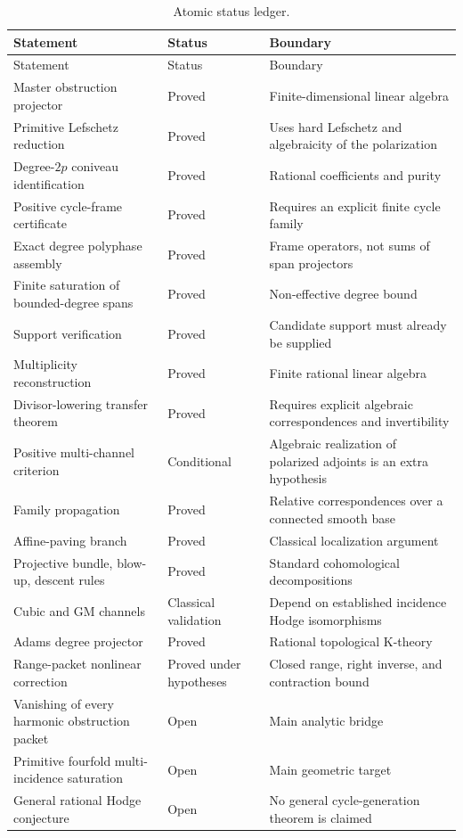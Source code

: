 \documentclass[11pt,oneside]{book}
\theoremstyle{definition}
\theoremstyle{remark}
\begin{document}
\begin{longtable}{p{}p{}p{}}
\caption{Atomic status ledger.}\label{tab:status}\\
\toprule
Statement & Status & Boundary \\
\midrule
\endfirsthead
\toprule
Statement & Status & Boundary \\
\midrule
\endhead
Master obstruction projector & Proved & Finite-dimensional linear algebra \\
Primitive Lefschetz reduction & Proved & Uses hard Lefschetz and algebraicity of the polarization \\
Degree-$2p$ coniveau identification & Proved & Rational coefficients and purity \\
Positive cycle-frame certificate & Proved & Requires an explicit finite cycle family \\
Exact degree polyphase assembly & Proved & Frame operators, not sums of span projectors \\
Finite saturation of bounded-degree spans & Proved & Non-effective degree bound \\
Support verification & Proved & Candidate support must already be supplied \\
Multiplicity reconstruction & Proved & Finite rational linear algebra \\
Divisor-lowering transfer theorem & Proved & Requires explicit algebraic correspondences and invertibility \\
Positive multi-channel criterion & Conditional & Algebraic realization of polarized adjoints is an extra hypothesis \\
Family propagation & Proved & Relative correspondences over a connected smooth base \\
Affine-paving branch & Proved & Classical localization argument \\
Projective bundle, blow-up, descent rules & Proved & Standard cohomological decompositions \\
Cubic and GM channels & Classical validation & Depend on established incidence Hodge isomorphisms \\
Adams degree projector & Proved & Rational topological K-theory \\
Range-packet nonlinear correction & Proved under hypotheses & Closed range, right inverse, and contraction bound \\
Vanishing of every harmonic obstruction packet & Open & Main analytic bridge \\
Primitive fourfold multi-incidence saturation & Open & Main geometric target \\
General rational Hodge conjecture & Open & No general cycle-generation theorem is claimed \\
\bottomrule
\end{longtable}
\end{document}
